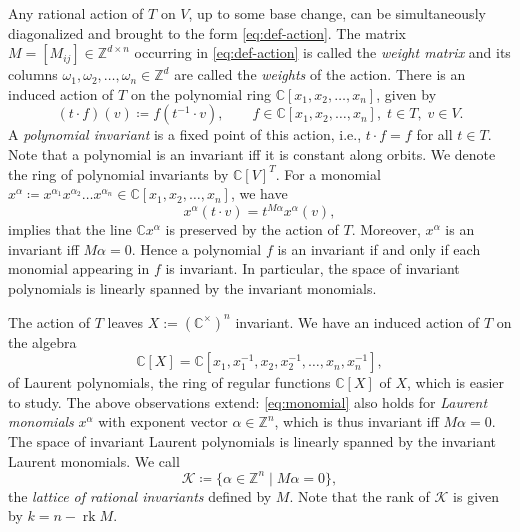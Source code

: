 \documentclass[a4paper,USenglish,cleveref,numberwithinsect]{lipics-v2021}
\DeclareMathOperator{\rk}{rk}
\DeclareMathOperator{\supp}{supp}
\newcommand{\CC}{\mathbb{C}}
\newcommand{\ZZ}{\mathbb{Z}}
\numberwithin{equation}{section}
\begin{document}
Any rational action of $T$ on $V$, up to some base change,
can be simultaneously diagonalized and brought to the form \cref{eq:def-action}.
The matrix $M=[M_{ij}]\in\ZZ^{d\times n}$ occurring in \cref{eq:def-action}
is called the \textit{weight matrix} and its columns
$\omega_1,\omega_2,\dots,\omega_n\in\ZZ^d$ are called
the \textit{weights} of the action.
There is an induced action of $T$ on the polynomial ring $\CC[x_1,x_2,\dots,x_n]$, given by
\[
 (t\cdot f)(v) \coloneqq f(t^{-1}\cdot v), \qquad f\in\CC[x_1,x_2,\dots,x_n],\; t\in T,\; v\in V.
\]
A \textit{polynomial invariant} is a fixed point of this action, i.e.,
$t\cdot f=f$ for all $t\in T$.
Note that a polynomial is an invariant iff it is constant along orbits.
We denote the ring of polynomial invariants by $\CC[V]^T$.
For a monomial $x^\alpha\coloneqq x^{\alpha_1}x^{\alpha_2}\dots x^{\alpha_n}\in\CC[x_1,x_2,\dots,x_n]$,
we have \begin{equation}
\label{eq:monomial}
x^\alpha(t\cdot v) = t^{M\alpha} x^\alpha(v),
\end{equation}
 implies that the line $\CC x^\alpha$ is preserved by the action of $T$.
Moreover, $x^\alpha$ is an invariant iff $M\alpha=0$.
Hence a polynomial $f$ is an invariant if and only if each monomial appearing in $f$ is invariant.
In particular, the space of invariant polynomials is linearly spanned by the invariant monomials.

The action of $T$ leaves $X := (\CC^\times)^n$ invariant.
We have an induced action of $T$ on the algebra
\[
 \CC[X] = \CC[x_1,x_1^{-1},x_2,x_2^{-1},\dots,x_n,x_n^{-1}],
\]
of Laurent polynomials,
the ring of regular functions $\CC[X]$ of $X$,
which is easier to study.
The above observations extend:
\cref{eq:monomial} also holds for \textit{Laurent monomials}
$x^{\alpha}$ with exponent vector $\alpha\in\ZZ^n$,
which is thus invariant iff $M\alpha=0$.
The space of invariant Laurent polynomials is linearly spanned by the invariant Laurent monomials.
We call
\begin{equation}
\label{eq:def-L}
    \mathcal{K} \coloneqq \{\alpha\in\ZZ^n\mid M\alpha=0\} ,
\end{equation}
the \emph{lattice of rational invariants} defined by $M$.
Note that the rank of $\mathcal{K}$ is given by $k= n - \rk M$.
\end{document}
